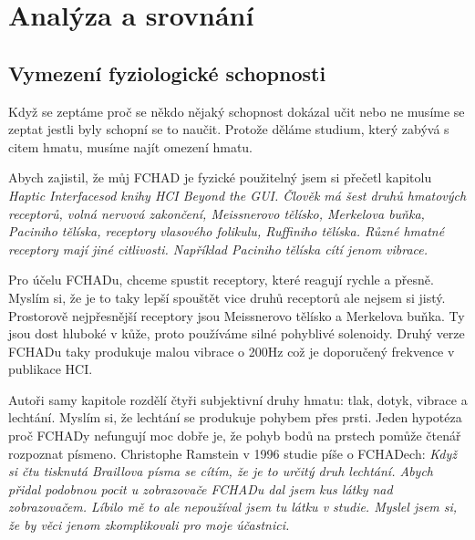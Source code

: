 \chapter{Analýza a srovnání}

\section{Vymezení fyziologické schopnosti}
Když se zeptáme proč se někdo nějaký schopnost dokázal učit nebo ne musíme se zeptat jestli byly schopní se to naučit.  Protože děláme studium, který zabývá s citem hmatu, musíme najít omezení hmatu.

Abych zajistil, že můj FCHAD je fyzické použitelný jsem si přečetl kapitolu \em Haptic Interfaces\em  od knihy \em HCI Beyond the GUI\em. Člověk má šest druhů hmatových receptorů, volná nervová zakončení, Meissnerovo tělísko, Merkelova buňka, Paciniho tělíska, receptory vlasového folikulu, Ruffiniho tělíska. Různé hmatné receptory mají jiné citlivosti.  Například Paciniho tělíska cítí jenom vibrace.

Pro účelu FCHADu, chceme spustit receptory, které reagují rychle a přesně.  Myslím si, že je to taky lepší spouštět vice druhů receptorů ale nejsem si jistý.  Prostorově nejpřesnější receptory jsou Meissnerovo tělísko a Merkelova buňka.  Ty jsou dost hluboké v kůže, proto používáme silné pohyblivé solenoidy.  Druhý verze FCHADu taky produkuje malou vibrace o 200Hz což je doporučený frekvence v publikace HCI\citep[str. 29-30]{nielsen2008gesture}.

Autoři samy kapitole rozdělí čtyři subjektivní druhy hmatu: tlak, dotyk, vibrace a lechtání.  Myslím si, že lechtání se produkuje pohybem přes prsti.  Jeden hypotéza proč FCHADy nefungují moc dobře je, že pohyb bodů na prstech pomůže čtenář rozpoznat písmeno.  Christophe Ramstein v 1996 studie píše o FCHADech: \em {} \em \citep[str. 38, přeložený z angličtiny]{ramstein1996combining}
Když si čtu tisknutá Braillova písma se cítím, že je to určitý druh lechtání.  Abych přidal podobnou pocit u zobrazovače FCHADu dal jsem kus látky nad zobrazovačem.  Líbilo mě to ale nepoužíval jsem tu látku v studie. Myslel jsem si, že by věci jenom zkomplikovali pro moje účastnici.

